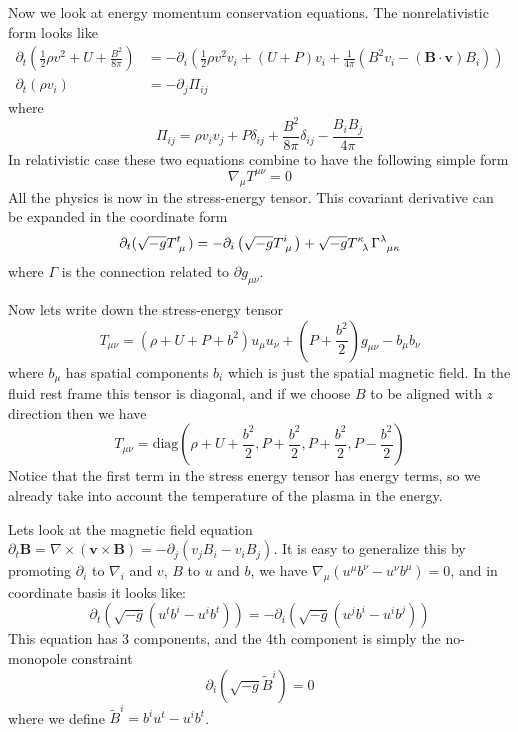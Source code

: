 \documentclass[letterpaper, 11pt]{article}
\numberwithin{equation}{section}
\numberwithin{figure}{section}
\begin{document}
Now we look at energy momentum conservation equations. The nonrelativistic form
looks like
\begin{align}
  \label{eq:26}
  \partial_t \left( \frac{1}{2}\rho v^2 + U + \frac{B^2}{8\pi} \right) &= -\partial_i \left( \frac{1}{2}\rho v^2v_i + (U + P)v_i + \frac{1}{4\pi} \left( B^2v_i - (\mathbf{B}\cdot \mathbf{v})B_i \right) \right) \\
  \partial_t(\rho v_i) &= -\partial_j\Pi_{ij}
\end{align}
where
\begin{equation}
  \label{eq:27}
  \Pi_{ij} = \rho v_iv_j + P\delta_{ij} + \frac{B^2}{8\pi}\delta_{ij} - \frac{B_iB_j}{4\pi}
\end{equation}
In relativistic case these two equations combine to have the following simple
form
\begin{equation}
  \label{eq:28}
  \nabla_{\mu} T^{\mu\nu} = 0
\end{equation}
All the physics is now in the stress-energy tensor. This covariant derivative
can be expanded in the coordinate form
\begin{equation}
  \label{eq:29}
  \partial_t(\sqrt{-g}\tensor{T}{^t_{\mu}}) = -\partial_i \left( \sqrt{-g}\tensor{T}{^i_{\mu}} \right) + \sqrt{-g}\tensor{T}{^{\kappa}_{\lambda}}\tensor{\Gamma}{^{\lambda}_{\mu\kappa}}
\end{equation}
where $\Gamma$ is the connection related to $\partial g_{\mu\nu}$.

Now lets write down the stress-energy tensor
\begin{equation}
  \label{eq:30}
  T_{\mu\nu} = (\rho + U + P + b^2)u_{\mu}u_{\nu} + \left(P + \frac{b^2}{2} \right)g_{\mu\nu} - b_{\mu}b_{\nu}
\end{equation}
where $b_{\mu}$ has spatial components $b_i$ which is just the spatial magnetic
field. In the fluid rest frame this tensor is diagonal, and if we choose $B$ to
be aligned with $z$ direction then we have
\begin{equation}
  \label{eq:31}
  T_{\mu\nu} = \text{diag} \left( \rho + U + \frac{b^2}{2}, P + \frac{b^2}{2}, P + \frac{b^2}{2}, P - \frac{b^2}{2} \right)
\end{equation}
Notice that the first term in the stress energy tensor has energy terms, so we
already take into account the temperature of the plasma in the energy.

Lets look at the magnetic field equation $\partial_t\mathbf{B} =
\nabla\times(\mathbf{v}\times \mathbf{B}) = -\partial_j(v_{j}B_i - v_iB_j)$. It
is easy to generalize this by promoting $\partial_i$ to $\nabla_i$ and $v$, $B$
to $u$ and $b$, we have $\nabla_{\mu}(u^{\mu}b^{\nu} - u^{\nu}b^{\mu}) = 0$, and
in coordinate basis it looks like:
\begin{equation}
  \label{eq:32}
  \partial_t \left( \sqrt{-g}(u^tb^i - u^ib^t) \right) = -\partial_i \left( \sqrt{-g} (u^jb^i - u^i b^j)\right)
\end{equation}
This equation has 3 components, and the 4th component is simply the no-monopole
constraint
\begin{equation}
  \label{eq:33}
  \partial_i(\sqrt{-g}\tilde{B}^i) = 0
\end{equation}
where we define $\tilde{B}^i = b^iu^t - u^ib^t$.
\end{document}
